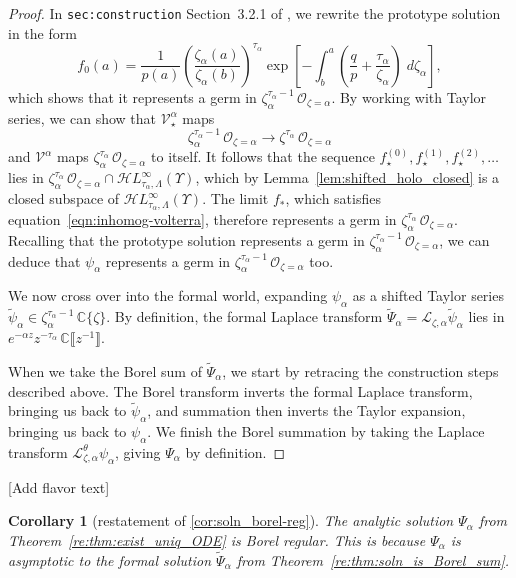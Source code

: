 \documentclass{article}
\newcommand{\singexp}[2]{\mathcal{H}L^\infty_{#1, #2}}
\newcommand{\C}{\mathbb{C}}
\newcommand{\volterra}{\mathcal{V}}
\newcommand{\softpart}{\mathcal{V}_\star}
\newcommand{\solproto}{f_0}
\newcommand{\solptb}{f_\star}
\newcommand{\series}[1]{\tilde{#1}}
\newcommand{\laplace}{\mathcal{L}}
\theoremstyle{definition}
\theoremstyle{plain}
\newtheorem{corollary}[theorem]{Corollary}
\newenvironment{unstable}{\color{YellowGreen}}{\color{black}}
\newcommand{\citesection}[1]{\begin{unstable}\texttt{#1}\end{unstable}}
\newenvironment{todo}{\color{Coral}}{\color{black}}
\begin{document}
\begin{proof}
In \citesection{sec:construction} Section~3.2.1 of \cite{reg-sing-volterra}, we rewrite the prototype solution in the form
\[ \solproto(a) = \frac{1}{p(a)} \left(\frac{\zeta_\alpha(a)}{\zeta_\alpha(b)}\right)^{\tau_\alpha} \exp\left[-\int_b^a \left( \frac{q}{p} + \frac{\tau_\alpha}{\zeta_\alpha} \right)\;d\zeta_\alpha\right], \]
which shows that it represents a germ in $\zeta_\alpha^{\tau_\alpha-1}\,\mathcal{O}_{\zeta = \alpha}$. By working with Taylor series, we can show that $\softpart^\alpha$ maps
\[ \zeta_\alpha^{\tau_\alpha-1}\,\mathcal{O}_{\zeta=\alpha} \to \zeta^{\tau_\alpha}\,\mathcal{O}_{\zeta=\alpha} \]
and $\volterra^\alpha$ maps $\zeta_\alpha^{\tau_\alpha}\,\mathcal{O}_{\zeta=\alpha}$ to itself. It follows that the sequence $\solptb^{(0)}, \solptb^{(1)}, \solptb^{(2)}, \ldots$ lies in $\zeta_\alpha^{\tau_\alpha}\,\mathcal{O}_{\zeta=\alpha} \cap \singexp{\tau_\alpha}{\Lambda}(\Upsilon)$, which by Lemma~\ref{lem:shifted_holo_closed} is a closed subspace of $\singexp{\tau_\alpha}{\Lambda}(\Upsilon)$. The limit $f_*$, which satisfies equation~\eqref{eqn:inhomog-volterra}, therefore represents a germ in $\zeta_\alpha^{\tau_\alpha}\,\mathcal{O}_{\zeta = \alpha}$. Recalling that the prototype solution represents a germ in $\zeta_\alpha^{\tau_\alpha-1}\,\mathcal{O}_{\zeta = \alpha}$, we can deduce that $\psi_\alpha$ represents a germ in $\zeta_\alpha^{\tau_\alpha-1}\,\mathcal{O}_{\zeta = \alpha}$ too.

We now cross over into the formal world, expanding $\psi_\alpha$ as a shifted Taylor series $\series{\psi}_\alpha \in \zeta_\alpha^{\tau_\alpha-1}\,\C\{\zeta\}$. By definition, the formal Laplace transform $\series{\Psi}_\alpha = \laplace_{\zeta, \alpha} \series{\psi}_\alpha$ lies in $e^{-\alpha z} z^{-\tau_\alpha}\,\C \llbracket z^{-1} \rrbracket$.

When we take the Borel sum of $\series{\Psi}_\alpha$, we start by retracing the construction steps described above. The Borel transform inverts the formal Laplace transform, bringing us back to $\series{\psi}_\alpha$, and summation then inverts the Taylor expansion, bringing us back to $\psi_\alpha$. We finish the Borel summation by taking the Laplace transform $\laplace^\theta_{\zeta, \alpha} \psi_\alpha$, giving $\Psi_\alpha$ by definition.
\end{proof}
\begin{todo}[Add flavor text]\end{todo}
\begin{corollary}[restatement of \ref{cor:soln_borel-reg}]\label{re:cor:soln_borel-reg}
The analytic solution $\Psi_\alpha$ from Theorem~\ref{re:thm:exist_uniq_ODE} is Borel regular. This is because $\Psi_\alpha$ is asymptotic to the formal solution $\series{\Psi}_\alpha$ from Theorem~\ref{re:thm:soln_is_Borel_sum}.
\end{corollary}
\end{document}
